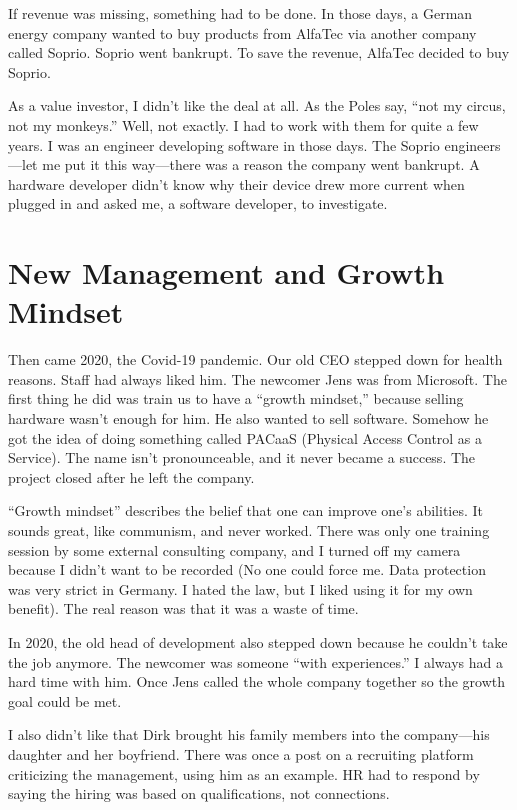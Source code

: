 If revenue was missing, something had to be done. In those days, a German energy company wanted to buy products from AlfaTec via another company called Soprio. Soprio went bankrupt. To save the revenue, AlfaTec decided to buy Soprio.

As a value investor, I didn't like the deal at all. As the Poles say, ``not my circus, not my monkeys.'' Well, not exactly. I had to work with them for quite a few years. I was an engineer developing software in those days. The Soprio engineers—let me put it this way—there was a reason the company went bankrupt. A hardware developer didn't know why their device drew more current when plugged in and asked me, a software developer, to investigate.

\section{New Management and Growth Mindset}

Then came 2020, the Covid-19 pandemic. Our old CEO stepped down for health reasons. Staff had always liked him. The newcomer Jens was from Microsoft. The first thing he did was train us to have a ``growth mindset,'' because selling hardware wasn't enough for him. He also wanted to sell software. Somehow he got the idea of doing something called PACaaS (Physical Access Control as a Service). The name isn't pronounceable, and it never became a success. The project closed after he left the company.

``Growth mindset'' describes the belief that one can improve one's abilities. It sounds great, like communism, and never worked. There was only one training session by some external consulting company, and I turned off my camera because I didn't want to be recorded (No one could force me. Data protection was very strict in Germany. I hated the law, but I liked using it for my own benefit). The real reason was that it was a waste of time.

In 2020, the old head of development also stepped down because he couldn't take the job anymore. 
The newcomer was someone ``with experiences.'' I always had a hard time with him. 
Once Jens called the whole company together so the growth goal could be met. 


I also didn't like that Dirk brought his family members into the company—his daughter and her boyfriend.
There was once a post on a recruiting platform criticizing the management, using him as an example.
HR had to respond by saying the hiring was based on qualifications, not connections.

